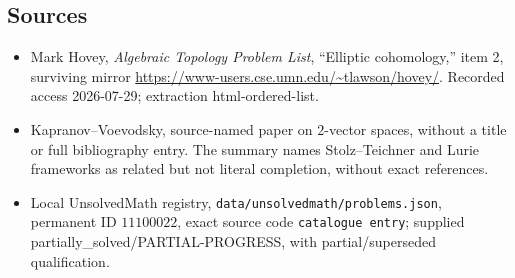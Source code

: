 \documentclass[11pt]{article}
\begin{document}
\subsection{Sources}
\begin{itemize}
\item Mark Hovey, \emph{Algebraic Topology Problem List}, ``Elliptic cohomology,'' item 2, surviving mirror \url{https://www-users.cse.umn.edu/~tlawson/hovey/}. Recorded access 2026-07-29; extraction html-ordered-list.
\item Kapranov--Voevodsky, source-named paper on \(2\)-vector spaces, without a title or full bibliography entry. The summary names Stolz--Teichner and Lurie frameworks as related but not literal completion, without exact references.
\item Local UnsolvedMath registry, \texttt{data/unsolvedmath/problems.json}, permanent ID \(11100022\), exact source code \texttt{catalogue entry}; supplied partially\_solved/PARTIAL-PROGRESS, with partial/superseded qualification.
\end{itemize}
\end{document}
